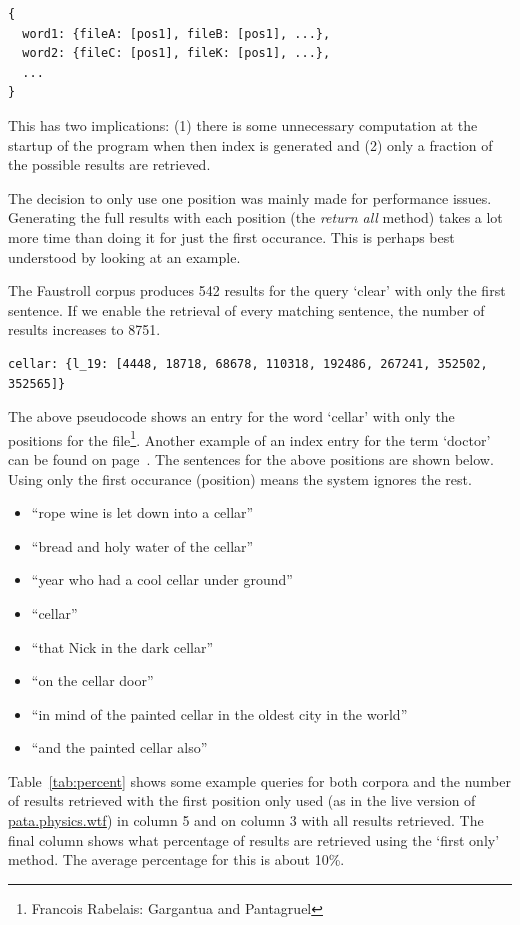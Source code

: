 \begin{verbatim}
{
  word1: {fileA: [pos1], fileB: [pos1], ...},
  word2: {fileC: [pos1], fileK: [pos1], ...},
  ...
}
\end{verbatim}

This has two implications: (1) there is some unnecessary computation at the startup of the program when then index is generated and (2) only a fraction of the possible results are retrieved.

The decision to only use one position was mainly made for performance issues. Generating the full results with each position (the \emph{return all} method) takes a lot more time than doing it for just the first occurance. This is perhaps best understood by looking at an example.

The Faustroll corpus produces \num{542} results for the query `clear' with only the first sentence. If we enable the retrieval of every matching sentence, the number of results increases to \num{8751}.

\begin{verbatim}
cellar: {l_19: [4448, 18718, 68678, 110318, 192486, 267241, 352502, 352565]}
\end{verbatim}

The above pseudocode shows an entry for the word `cellar' with only the positions for the  file\footnote{Francois Rabelais: Gargantua and Pantagruel}. Another example of an index entry for the term `doctor' can be found on page~\pageref{c:pos}. The sentences for the above positions are shown below. Using only the first occurance (position) means the system ignores the rest.

\begin{itemize}
  \item ``rope wine is let down into a cellar''
  \item ``bread and holy water of the cellar''
  \item ``year who had a cool cellar under ground''
  \item ``cellar''
  \item ``that Nick in the dark cellar''
  \item ``on the cellar door''
  \item ``in mind of the painted cellar in the oldest city in the world''
  \item ``and the painted cellar also''
\end{itemize}

Table~\ref{tab:percent} shows some example queries for both corpora and the number of results retrieved with the first position only used (as in the live version of \url{pata.physics.wtf}) in column 5 and on column 3 with all results retrieved. The final column shows what percentage of results are retrieved using the `first only' method. The average percentage for this is about 10\%. 

